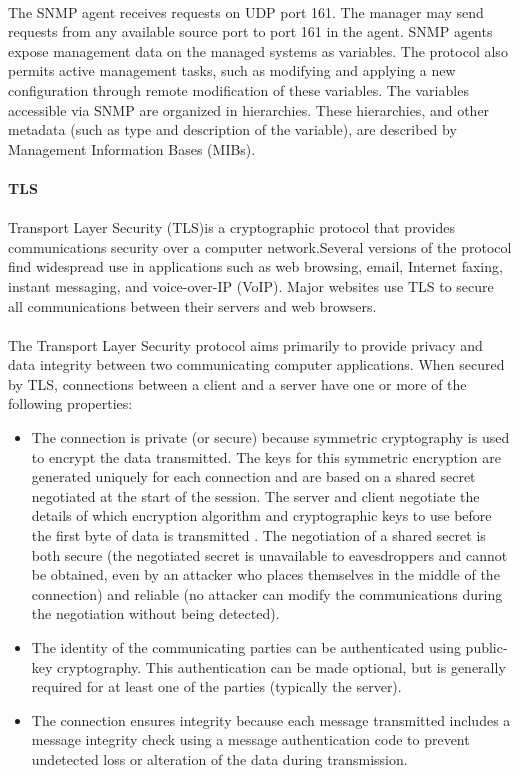 \paragraph{}
The SNMP agent receives requests on UDP port 161. The manager may send requests from any available source port to port 161 in the agent. SNMP agents expose management data on the managed systems as variables. The protocol also permits active management tasks, such as modifying and applying a new configuration through remote modification of these variables. The variables accessible via SNMP are organized in hierarchies. These hierarchies, and other metadata (such as type and description of the variable), are described by Management Information Bases (MIBs).

\paragraph{} \textbf{TLS}
\paragraph{}
Transport Layer Security (TLS)is a cryptographic protocol that provides communications security over a computer network.Several versions of the protocol find widespread use in applications such as web browsing, email, Internet faxing, instant messaging, and voice-over-IP (VoIP). Major websites use TLS to secure all communications between their servers and web browsers.
\paragraph{}
The Transport Layer Security protocol aims primarily to provide privacy and data integrity between two communicating computer applications. When secured by TLS, connections between a client  and a server have one or more of the following properties:
\begin{itemize}
\item The connection is private (or secure) because symmetric cryptography is used to encrypt the data transmitted. The keys for this symmetric encryption are generated uniquely for each connection and are based on a shared secret negotiated at the start of the session. The server and client negotiate the details of which encryption algorithm and cryptographic keys to use before the first byte of data is transmitted . The negotiation of a shared secret is both secure (the negotiated secret is unavailable to eavesdroppers and cannot be obtained, even by an attacker who places themselves in the middle of the connection) and reliable (no attacker can modify the communications during the negotiation without being detected).
\item The identity of the communicating parties can be authenticated using public-key cryptography. This authentication can be made optional, but is generally required for at least one of the parties (typically the server).
\item The connection ensures integrity because each message transmitted includes a message integrity check using a message authentication code to prevent undetected loss or alteration of the data during transmission.
\end{itemize}


